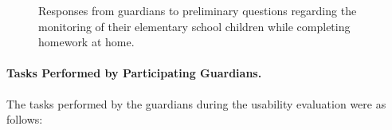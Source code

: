 \begin{figure}[!htbp]
\begin{minipage}{0.45\textwidth}
                        \label{fig:monitoring-frequency}
                    \end{minipage}
                    \begin{minipage}{0.45\textwidth}
                        \centering
                        \label{fig:concentration-strategies}
                    \end{minipage}
                    \caption{Responses from guardians to preliminary questions regarding the monitoring of their elementary school children while completing homework at home.}
                    \label{fig:previous-questions}
                \end{figure}
                
                \paragraph{Tasks Performed by Participating Guardians.}
                The tasks performed by the guardians during the usability evaluation were as follows:
                
